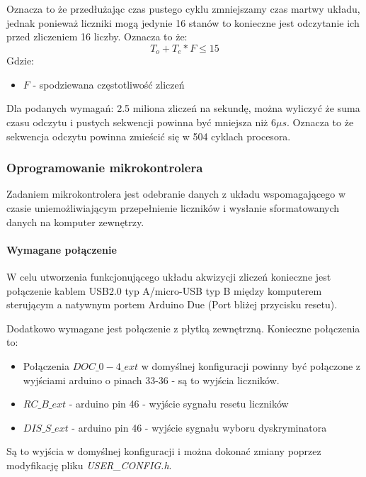 \documentclass[a4paper,12pt]{article}
\begin{document}
Oznacza to że przedłużając czas pustego cyklu zmniejszamy czas martwy układu, jednak ponieważ liczniki mogą jedynie 16 stanów to konieczne jest odczytanie ich przed zliczeniem 16 liczby. 
Oznacza to że:
\begin{equation}
        T_o+T_e * F \leqslant 15
\end{equation}
        Gdzie:
\begin{itemize}
        \item $F$ - spodziewana częstotliwość zliczeń
\end{itemize}

Dla podanych wymagań: 2.5 miliona zliczeń na sekundę, można wyliczyć że suma czasu odczytu i pustych sekwencji powinna być mniejsza niż 6$\mu s$.
Oznacza to że sekwencja odczytu powinna zmieścić się w 504 cyklach procesora. 

\subsubsection{Oprogramowanie mikrokontrolera}

Zadaniem mikrokontrolera jest odebranie danych z układu wspomagającego w czasie uniemożliwiającym przepełnienie liczników i wysłanie sformatowanych danych na komputer zewnętrzy. 

\paragraph{Wymagane połączenie}
W celu utworzenia funkcjonującego układu akwizycji zliczeń konieczne jest połączenie kablem USB2.0 typ A/micro-USB typ B między komputerem sterującym a natywnym portem Arduino Due (Port bliżej przycisku resetu).

Dodatkowo wymagane jest połączenie z płytką zewnętrzną. Konieczne połączenia to:
\begin{itemize}
        \item Połączenia $DOC\_0-4\_ext$ w domyślnej konfiguracji powinny być połączone z wyjściami arduino o pinach 33-36 - są to wyjścia liczników.
        \item $RC\_B\_ext$ - arduino pin 46 - wyjście sygnału resetu liczników 
        \item $DIS\_S\_ext$ - arduino pin 46 - wyjście sygnału wyboru dyskryminatora
\end{itemize}

Są to wyjścia w domyślnej konfiguracji i można dokonać zmiany poprzez modyfikację pliku \textit{USER\_CONFIG.h}.
\end{document}
